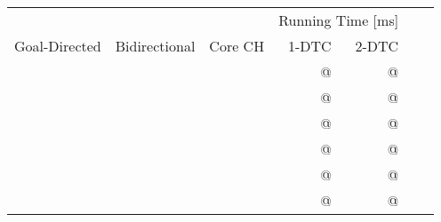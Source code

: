 \begin{tabular}{cccrrrr}
	\toprule
	              &               &         & \multicolumn{2}{c}{Running Time [\si{\milli\second}]}         \\
	Goal-Directed & Bidirectional & Core CH & 1-DTC                                                 & 2-DTC \\
	\midrule
	\xmark        & \xmark        & \xmark  & @                                                     & @     \\
	\cmark        & \xmark        & \xmark  & @                                                     & @     \\
	\xmark        & \cmark        & \xmark  & @                                                     & @     \\
	\cmark        & \cmark        & \xmark  & @                                                     & @     \\
	\xmark        & \cmark        & \cmark  & @                                                     & @     \\
	\cmark        & \cmark        & \cmark  & @                                                     & @     \\
	\bottomrule
\end{tabular}